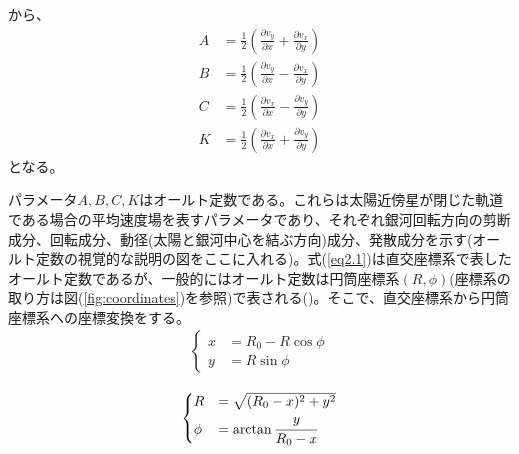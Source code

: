 から、
\begin{subequations}
\begin{align}
	A &=\frac{1}{2}\left(\frac{\partial v_y}{\partial x} + \frac{\partial v_x}{\partial y}\right) \label{eq2.1a}\\
	B &=\frac{1}{2}\left(\frac{\partial v_y}{\partial x} - \frac{\partial v_x}{\partial y}\right) \label{eq2.1b}\\
	C &=\frac{1}{2}\left(\frac{\partial v_x}{\partial x} - \frac{\partial v_y}{\partial y}\right) \label{eq2.1c}\\
	K &=\frac{1}{2}\left(\frac{\partial v_x}{\partial x} + \frac{\partial v_y}{\partial y}\right) \label{eq2.1d}
\end{align} \label{eq2.1}
\end{subequations}
となる。

パラメータ$A,B,C,K$はオールト定数である。これらは太陽近傍星が閉じた軌道である場合の平均速度場を表すパラメータであり、それぞれ銀河回転方向の剪断成分、回転成分、動径(太陽と銀河中心を結ぶ方向)成分、発散成分を示す(オールト定数の視覚的な説明の図をここに入れる)。式(\ref{eq2.1})は直交座標系で表したオールト定数であるが、一般的にはオールト定数は円筒座標系$(R,\phi)$(座標系の取り方は図(\ref{fig:coordinates})を参照)で表される(\cite{Chandra42})。そこで、直交座標系から円筒座標系への座標変換をする。
\begin{align}
\begin{cases}
	x &= R_0 - R\cos{\phi}\\
	y &= R\sin{\phi}
\end{cases}
\end{align}

\begin{align}
\begin{cases}
	R &= \sqrt{(R_0-x)^2 + y^2 }\\
	\phi &= \arctan{\cfrac{y}{R_0-x}}
\end{cases}
\end{align}

